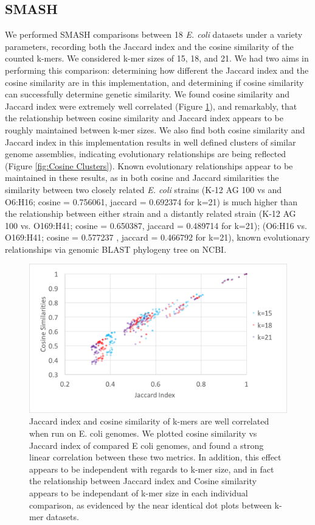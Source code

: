 \documentclass[12pt, letterpaper]{article}
\begin{document}
\subsection{SMASH}
We performed SMASH comparisons between 18 \textit{E. coli} datasets under a variety parameters, recording both the Jaccard index and the cosine similarity of the counted k-mers. We considered k-mer sizes of 15, 18, and 21. We had two aims in performing this comparison: determining how different the Jaccard index and the cosine similarity are in this implementation, and determining if cosine similarity can successfully determine genetic similarity. We found cosine similarity and Jaccard index were extremely well correlated (Figure \ref{fig:Correlation Jaccard and Cosine}), and remarkably, that the relationship between cosine similarity and Jaccard index appears to be roughly maintained between k-mer sizes. We also find both cosine similarity and Jaccard index in this implementation results in well defined clusters of similar genome assemblies, indicating evolutionary relationships are being reflected (Figure \ref{fig:Cosine Clusters}). Known evolutionary relationships appear to be maintained in these results, as in both cosine and Jaccard similarities the similarity between two closely related \textit{E. coli} strains (K-12 AG 100 vs and O6:H16; cosine = 0.756061, jaccard = 0.692374 for k=21) is much higher than the relationship between either strain and a distantly related strain (K-12 AG 100 vs. O169:H41; cosine = 0.650387, jaccard = 0.489714 for k=21); (O6:H16 vs. O169:H41; cosine = 0.577237 , jaccard = 0.466792 for k=21), known evolutionary relationships via genomic BLAST phylogeny tree on NCBI.
\FloatBarrier
\begin{figure}[h]
	\centering
	\includegraphics[width=1.0\textwidth]{smashchart.png}
	\caption{Jaccard index and cosine similarity of k-mers are well correlated when run on E. coli genomes. We plotted cosine similarity vs Jaccard index of compared E coli genomes, and found a strong linear correlation between these two metrics. In addition, this effect appears to be independent with regards to k-mer size, and in fact the relationship between Jaccard index and Cosine similarity appears to be independant of k-mer size in each individual comparison, as evidenced by the near identical dot plots between k-mer datasets.}
	\label{fig:Correlation Jaccard and Cosine}
\end{figure}
\end{document}
